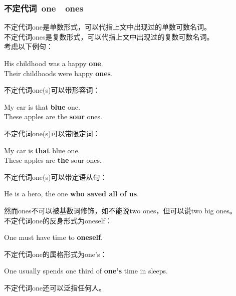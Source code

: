 \documentclass[UTF8]{ctexart}
\newcommand{\littf}[1]{{\hspace{3pt}\ttfamily #1}}
\begin{document}
\subsubsection{不定代词~\littf{one}~~\littf{ones}}
    不定代词\littf{one\hphantom{s}}是单数形式，可以代指上文中出现过的单数可数名词。\\[3mm]
    不定代词\littf{ones}是复数形式，可以代指上文中出现过的复数可数名词。\\[3mm]
    考虑以下例句：
    \begin{center}
        \ttfamily\large
        His childhood was a happy \textbf{one}.\\[3mm]
        Their childhoods were happy \textbf{ones}.\\[6mm]
    \end{center}
    不定代词\littf{one(s)}可以带形容词：
    \begin{center}
        \ttfamily\large
        My car is that \textbf{blue} one.\\[3mm]
        These apples are the \textbf{sour} ones.\\[6mm]
    \end{center}
    不定代词\littf{one(s)}可以带限定词：
    \begin{center}
        \ttfamily\large
        My car is \textbf{that} blue one.\\[3mm]
        These apples are \textbf{the} sour ones.\\[6mm]
    \end{center}
    不定代词\littf{one(s)}可以带定语从句：
    \begin{center}
        \ttfamily\large
        He is a hero, the one \textbf{who saved all of us}.\\[6mm]
    \end{center}
    然而\littf{ones}不可以被基数词修饰，如不能说\littf{two ones}，但可以说\littf{two big ones}。\\[10mm]
    不定代词\littf{one}的反身形式为\littf{oneself}：
    \begin{center}
        \ttfamily\large
        One must have time to \textbf{oneself}.\\[6mm]
    \end{center}
    不定代词\littf{one}的属格形式为\littf{one's}：
    \begin{center}
        \ttfamily\large
        One usually spends one third of \textbf{one's} time in sleeps.\\[6mm]
    \end{center}
    不定代词\littf{one}还可以泛指任何人。
\end{document}
